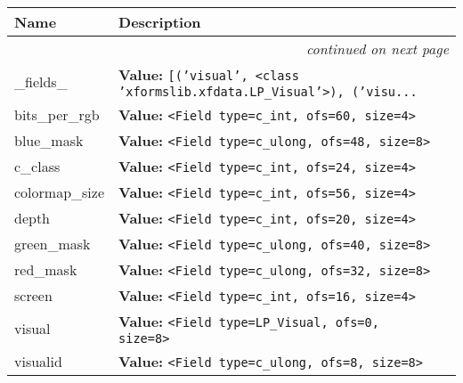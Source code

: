     \vspace{-1cm}
\hspace{\varindent}\begin{longtable}{|p{\varnamewidth}|p{\vardescrwidth}|l}
\cline{1-2}
\cline{1-2} \centering \textbf{Name} & \centering \textbf{Description}& \\
\cline{1-2}
\endhead\cline{1-2}\multicolumn{3}{r}{\small\textit{continued on next page}}\\\endfoot\cline{1-2}
\endlastfoot\raggedright \_\-f\-i\-e\-l\-d\-s\-\_\- & \raggedright \textbf{Value:} 
{\tt \texttt{[}\texttt{(}\texttt{'}\texttt{visual}\texttt{'}\texttt{, }{\textless}class 'xformslib.xfdata.LP\_Visual'{\textgreater}\texttt{)}\texttt{, }\texttt{(}\texttt{'}\texttt{visu}\texttt{...}}&\\
\cline{1-2}
\raggedright b\-i\-t\-s\-\_\-p\-e\-r\-\_\-r\-g\-b\- & \raggedright \textbf{Value:} 
{\tt {\textless}Field type=c\_int, ofs=60, size=4{\textgreater}}&\\
\cline{1-2}
\raggedright b\-l\-u\-e\-\_\-m\-a\-s\-k\- & \raggedright \textbf{Value:} 
{\tt {\textless}Field type=c\_ulong, ofs=48, size=8{\textgreater}}&\\
\cline{1-2}
\raggedright c\-\_\-c\-l\-a\-s\-s\- & \raggedright \textbf{Value:} 
{\tt {\textless}Field type=c\_int, ofs=24, size=4{\textgreater}}&\\
\cline{1-2}
\raggedright c\-o\-l\-o\-r\-m\-a\-p\-\_\-s\-i\-z\-e\- & \raggedright \textbf{Value:} 
{\tt {\textless}Field type=c\_int, ofs=56, size=4{\textgreater}}&\\
\cline{1-2}
\raggedright d\-e\-p\-t\-h\- & \raggedright \textbf{Value:} 
{\tt {\textless}Field type=c\_int, ofs=20, size=4{\textgreater}}&\\
\cline{1-2}
\raggedright g\-r\-e\-e\-n\-\_\-m\-a\-s\-k\- & \raggedright \textbf{Value:} 
{\tt {\textless}Field type=c\_ulong, ofs=40, size=8{\textgreater}}&\\
\cline{1-2}
\raggedright r\-e\-d\-\_\-m\-a\-s\-k\- & \raggedright \textbf{Value:} 
{\tt {\textless}Field type=c\_ulong, ofs=32, size=8{\textgreater}}&\\
\cline{1-2}
\raggedright s\-c\-r\-e\-e\-n\- & \raggedright \textbf{Value:} 
{\tt {\textless}Field type=c\_int, ofs=16, size=4{\textgreater}}&\\
\cline{1-2}
\raggedright v\-i\-s\-u\-a\-l\- & \raggedright \textbf{Value:} 
{\tt {\textless}Field type=LP\_Visual, ofs=0, size=8{\textgreater}}&\\
\cline{1-2}
\raggedright v\-i\-s\-u\-a\-l\-i\-d\- & \raggedright \textbf{Value:} 
{\tt {\textless}Field type=c\_ulong, ofs=8, size=8{\textgreater}}&\\
\cline{1-2}
\end{longtable}

